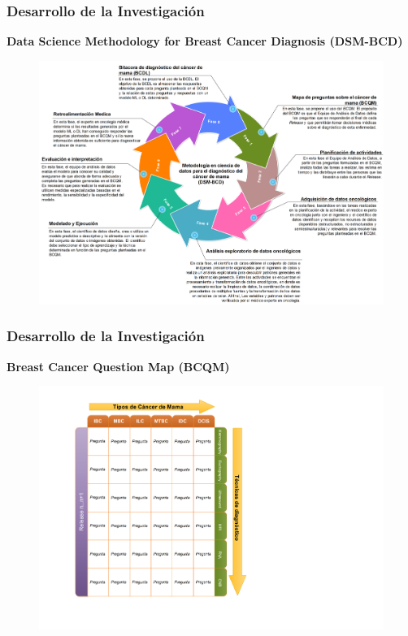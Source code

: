 \documentclass[xcolor=dvipsnames,xcolor=table,10pt]{beamer} %
\begin{document}
\begin{frame}
	\frametitle{Desarrollo de la Investigación}{\textbf{Data Science Methodology for Breast Cancer Diagnosis (DSM-BCD)}}
	\begin{figure}[h!]
		\centering
		\includegraphics[width=0.87\linewidth]{IMAGENES/DSM-BCD_SPANISH}
	\end{figure}
\end{frame}

\begin{frame}
	\frametitle{Desarrollo de la Investigación}{\textbf{Breast Cancer Question Map (BCQM)}}
	\begin{figure}[h!]
		\centering
		\includegraphics[width=0.5\linewidth]{IMAGENES/BCQM_SPANISH}
	\end{figure}
\end{frame}	
\end{document}
